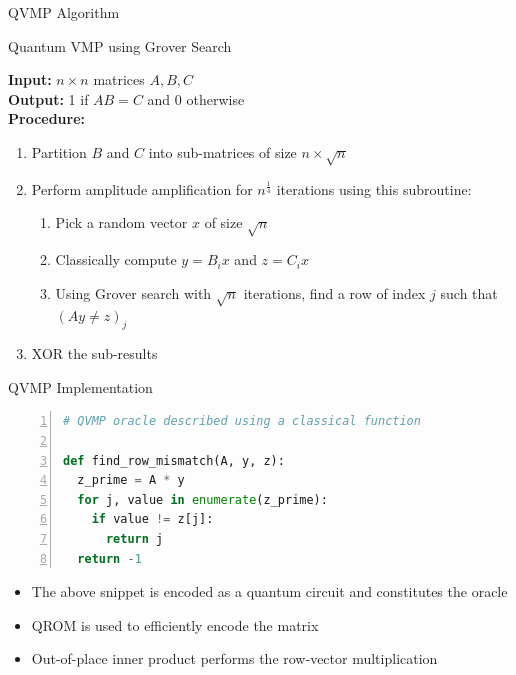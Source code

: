 \documentclass[10pt]{beamer}
\begin{document}
\begin{frame}{QVMP Algorithm}
\begin{algorithm}[H]
  \caption{Quantum VMP using Grover Search}
  \label{alg:qvmp_grover}
  \textbf{Input: } $n \times n$ matrices $A, B, C$ \\
  \textbf{Output: } 1 if $AB = C$ and 0 otherwise \\
  \textbf{Procedure: }
  \begin{enumerate}
    \item Partition $B$ and $C$ into sub-matrices of size $n \times \sqrt{n}$
    \item 
      {
        Perform amplitude amplification for $n^{\frac{1}{4}}$ iterations using this subroutine:
        \begin{enumerate}
          \item Pick a random vector $x$ of size $\sqrt{n}$
          \item Classically compute $y = B_ix$ and $z = C_ix$
          \item Using Grover search with $\sqrt{n}$ iterations, find a row of
            index $j$ such that $(Ay \neq z)_j$
        \end{enumerate}
      }
    \item XOR the sub-results
  \end{enumerate}
\end{algorithm}
\end{frame}

\begin{frame}[fragile]{QVMP Implementation}
  \begin{lstlisting}[frame=single,language=Python, numbers=left]
# QVMP oracle described using a classical function

def find_row_mismatch(A, y, z):
  z_prime = A * y
  for j, value in enumerate(z_prime):
    if value != z[j]:
      return j
  return -1
  \end{lstlisting}

  \begin{itemize}
    \item The above snippet is encoded as a quantum circuit and constitutes
      the oracle
    \item QROM is used to efficiently encode the matrix
    \item Out-of-place inner product performs the row-vector multiplication
  \end{itemize}
\end{frame}
\end{document}
